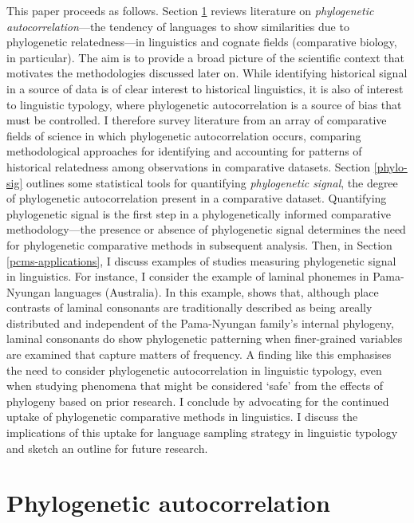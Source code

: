 This paper proceeds as follows. Section \ref{phylo-autocorrelation} reviews literature on \emph{phylogenetic autocorrelation}---the tendency of languages to show similarities due to phylogenetic relatedness---in linguistics and cognate fields (comparative biology, in particular). The aim is to provide a broad picture of the scientific context that motivates the methodologies discussed later on. While identifying historical signal in a source of data is of clear interest to historical linguistics, it is also of interest to linguistic typology, where phylogenetic autocorrelation is a source of bias that must be controlled. I therefore survey literature from an array of comparative fields of science in which phylogenetic autocorrelation occurs, comparing methodological approaches for identifying and accounting for patterns of historical relatedness among observations in comparative datasets. Section \ref{phylo-sig} outlines some statistical tools for quantifying \emph{phylogenetic signal}, the degree of phylogenetic autocorrelation present in a comparative dataset. Quantifying phylogenetic signal is the first step in a phylogenetically informed comparative methodology---the presence or absence of phylogenetic signal determines the need for phylogenetic comparative methods in subsequent analysis. Then, in Section \ref{pcms-applications}, I discuss examples of studies measuring phylogenetic signal in linguistics. For instance, I consider the example of laminal phonemes in Pama-Nyungan languages (Australia). In this example, \textcite{round_continent-wide_2017} shows that, although place contrasts of laminal consonants are traditionally described as being areally distributed and independent of the Pama-Nyungan family's internal phylogeny, laminal consonants do show phylogenetic patterning when finer-grained variables are examined that capture matters of frequency. A finding like this emphasises the need to consider phylogenetic autocorrelation in linguistic typology, even when studying phenomena that might be considered `safe' from the effects of phylogeny based on prior research. I conclude by advocating for the continued uptake of phylogenetic comparative methods in linguistics. I discuss the implications of this uptake for language sampling strategy in linguistic typology and sketch an outline for future research.

\hypertarget{phylo-autocorrelation}{%
\section{Phylogenetic autocorrelation}\label{phylo-autocorrelation}}

